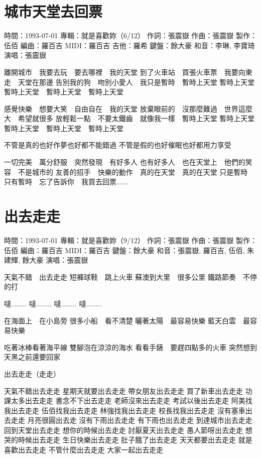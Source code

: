 \documentclass[UTF8,a4paper,oneside,twocolumn,12pt]{ctexbook}
\newcommand{\infopair}[2]{\textbullet #1：#2}
\newcommand{\zc}[1][伍佰]{\infopair{作詞}{#1}}
\newcommand{\zq}[1][伍佰]{\infopair{作曲}{#1}}
\newcommand{\bq}[1][伍佰]{\infopair{編曲}{#1}}
\newcommand{\zj}[1]{\infopair{專輯}{#1}}
\newcommand{\zz}[1]{\infopair{製作}{#1}}
\newcommand{\sj}[1]{\infopair{時間}{#1}}
\newenvironment{info}{\begin{flushleft}\kaishu
	}
	{\end{flushleft}\normalsize\yahei\par}
\newenvironment{lyric}{
	}
{}
\begin{document}
\section{城市天堂去回票}
\begin{info}
	\sj{1993-07-01}
	\zj{就是喜歡妳（6/12）}
	\zc[張震嶽]
	\zq[張震嶽]
	\zz{伍佰}
	\bq[羅百吉]
	\infopair{MIDI}{羅百吉}
	\infopair{吉他}{羅希}
	\infopair{鍵盤}{餘大豪}
	\infopair{和音}{李琳, 李寶琦}
	\infopair{演唱}{張震嶽}
\end{info}
\begin{lyric}
	離開城市　我要去玩　要去哪裡　我的天堂
	到了火車站　買張火車票　我要向東走　天堂在那邊
	告別我的狗　吻別小愛人　我只是暫時　暫時上天堂
	暫時上天堂　暫時上天堂　暫時上天堂　暫時上天堂

	感覺快樂　想要大笑　自由自在　我的天堂
	放棄眼前的　沒那麼難過　世界這麼大　希望就很多
	放輕鬆一點　不要太鐵齒　就像我一樣　暫時上天堂
	暫時上天堂　暫時上天堂　暫時上天堂　暫時上天堂

	不管是真的也好作夢也好都不能錯過
	不管是假的也好催眠也好都用力享受

	一切完美　萬分舒服　突然發現　有好多人
	也有好多人　也在天堂上　他們的笑容　不是城市的
	友善的招手　快樂的動作　真的在天堂　真的在天堂
	只是暫時　只有暫時　忘了告訴你　我買去回票......
\end{lyric}

\section{出去走走}
\begin{info}
	\sj{1993-07-01}
	\zj{就是喜歡妳（9/12）}
	\zc[張震嶽]
	\zq[張震嶽]
	\zz{伍佰}
	\bq[羅百吉]
	\infopair{MIDI}{羅百吉}
	\infopair{鍵盤}{餘大豪}
	\infopair{和音}{張震嶽, 羅百吉, 伍佰, 朱建輝, 餘大豪}
	\infopair{演唱}{張震嶽}
\end{info}
\begin{lyric}
	天氣不錯　出去走走
	短褲球鞋　跳上火車
	蘇澳到大里　很多公里
	鐵路節奏　不停的打

	噠........ 噠........
	噠........ 噠........

	在海面上　在小島旁
	很多小船　看不清楚
	曬著太陽　最容易快樂
	藍天白雲　最容易快樂

	吃著冰棒看著海平線
	雙腳泡在涼涼的海水
	看看手錶　要趕四點多的火車
	突然想到天黑之前還要回家

	出去走走（走走）

	天氣不錯出去走走 星期天就要出去走走
	帶女朋友出去走走 買了新車出去走走
	功課太多出去走走 書念不下出去走走
	老師沒來出去走走 考試以後出去走走
	阿美找我出去走走 伍佰找我出去走走
	林強找我出去走走 校長找我出去走走
	沒有塞車出去走走 月亮很圓出去走
	沒有下雨出去走走 有下雨也出去走走
	到達城市出去走走 回到天堂出去走走
	想你的時候出去走走 討厭夏天出去走走
	愚人節呀出去走走 想哭的時候出去走走
	生日快樂出去走走 肚子餓了出去走走
	天天都要出去走走 就是喜歡出去走走
	不管什麼出去走走 大家一起出去走走
\end{lyric}
\end{document}
